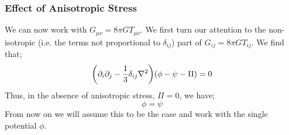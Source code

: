 \subsubsection*{Effect of Anisotropic Stress}
We can now work with $G_{\mu\nu} = 8\pi G T_{\mu\nu}$. We first turn our attention to the non-isotropic (i.e. the terms not proportional to $\delta_{ij}$) part of $G_{ij} = 8\pi G T_{ij}$. We find that;
\begin{equation}
\left(\del_i \del_j - \frac{1}{3}\delta_{ij}\nabla^2\right)(\phi - \psi - \Pi) = 0
\end{equation}
Thus, in the absence of anisotropic stress, $\Pi = 0$, we have;
\begin{equation}
\phi = \psi
\end{equation}
From now on we will assume this to be the case and work with the single potential $\phi$.
